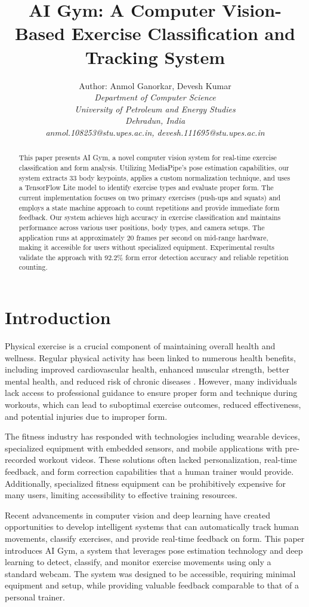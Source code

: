 \documentclass[11pt]{article}
\title{\textbf{AI Gym: A Computer Vision-Based Exercise Classification and Tracking System}}
\author{Author: Anmol Ganorkar, Devesh Kumar \\
\textit{Department of Computer Science}\\
\textit{University of Petroleum and Energy Studies}\\
\textit{Dehradun, India}\\
\textit{anmol.108253@stu.upes.ac.in,               
devesh.111695@stu.upes.ac.in 
}
}
\begin{document}
\maketitle

\begin{abstract}
This paper presents AI Gym, a novel computer vision system for real-time exercise classification and form analysis. Utilizing MediaPipe's pose estimation capabilities, our system extracts 33 body keypoints, applies a custom normalization technique, and uses a TensorFlow Lite model to identify exercise types and evaluate proper form. The current implementation focuses on two primary exercises (push-ups and squats) and employs a state machine approach to count repetitions and provide immediate form feedback. Our system achieves high accuracy in exercise classification and maintains performance across various user positions, body types, and camera setups. The application runs at approximately 20 frames per second on mid-range hardware, making it accessible for users without specialized equipment. Experimental results validate the approach with 92.2\% form error detection accuracy and reliable repetition counting.
\end{abstract}


\section{Introduction}
Physical exercise is a crucial component of maintaining overall health and wellness. Regular physical activity has been linked to numerous health benefits, including improved cardiovascular health, enhanced muscular strength, better mental health, and reduced risk of chronic diseases \cite{warburton2006}. However, many individuals lack access to professional guidance to ensure proper form and technique during workouts, which can lead to suboptimal exercise outcomes, reduced effectiveness, and potential injuries due to improper form.

The fitness industry has responded with technologies including wearable devices, specialized equipment with embedded sensors, and mobile applications with pre-recorded workout videos. These solutions often lacked personalization, real-time feedback, and form correction capabilities that a human trainer would provide. Additionally, specialized fitness equipment can be prohibitively expensive for many users, limiting accessibility to effective training resources.

Recent advancements in computer vision and deep learning have created opportunities to develop intelligent systems that can automatically track human movements, classify exercises, and provide real-time feedback on form. This paper introduces AI Gym, a system that leverages pose estimation technology and deep learning to detect, classify, and monitor exercise movements using only a standard webcam. The system was designed to be accessible, requiring minimal equipment and setup, while providing valuable feedback comparable to that of a personal trainer.
\begin{figure}[htbp]

\end{figure}
\end{document}
